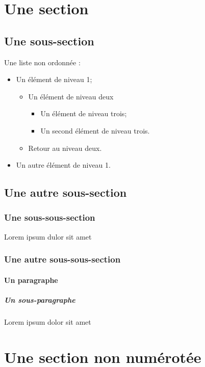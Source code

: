 \section{Une section}

\subsection{Une sous-section}

Une liste non ordonnée :
\begin{itemize}
    \item Un élément de niveau 1;
    \begin{itemize}
        \item Un élément de niveau deux
        \begin{itemize}
            \item Un élément de niveau trois;
            \item Un second élément de niveau trois.
        \end{itemize}
        \item Retour au niveau deux.
    \end{itemize}
    \item Un autre élément de niveau 1.
\end{itemize}

\subsection{Une autre sous-section}
\subsubsection{Une sous-sous-section}
Lorem ipsum dulor sit amet
\subsubsection{Une autre sous-sous-section}
\paragraph{Un paragraphe}
\subparagraph{Un sous-paragraphe}
Lorem ipsum dolor sit amet
\section*{Une section non numérotée}
